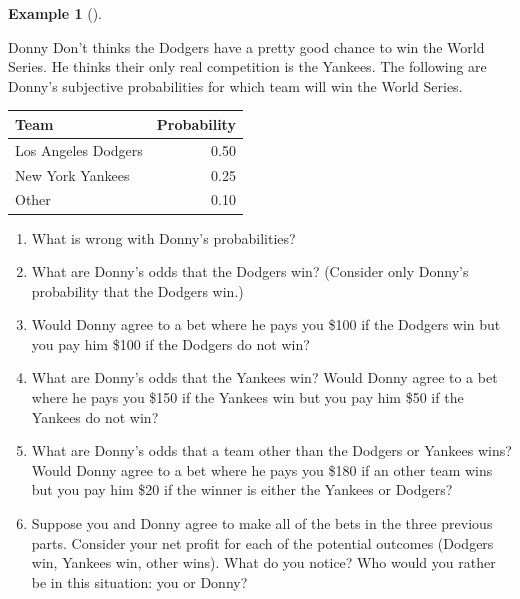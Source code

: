 \documentclass[
  letterpaper,
  DIV=11,
  numbers=noendperiod]{scrreprt}
\providecommand{\tightlist}{%
  \setlength{\itemsep}{0pt}\setlength{\parskip}{0pt}}
\theoremstyle{plain}
\theoremstyle{definition}
\newtheorem{example}{Example}[chapter]
\theoremstyle{definition}
\theoremstyle{definition}
\theoremstyle{remark}
\begin{document}
\begin{tcolorbox}[enhanced jigsaw, opacityback=0, left=2mm, colframe=quarto-callout-note-color-frame, toprule=.15mm, breakable, colback=white, leftrule=.75mm, arc=.35mm, rightrule=.15mm, bottomrule=.15mm]

\begin{example}[]\protect\hypertarget{exm-dutch}{}\label{exm-dutch}

Donny Don't thinks the Dodgers have a pretty good chance to win the
World Series. He thinks their only real competition is the Yankees. The
following are Donny's subjective probabilities for which team will win
the World Series.

\begin{longtable}[]{@{}lr@{}}
\toprule\noalign{}
Team & Probability \\
\midrule\noalign{}
\endhead
\bottomrule\noalign{}
\endlastfoot
Los Angeles Dodgers & 0.50 \\
New York Yankees & 0.25 \\
Other & 0.10 \\
\end{longtable}

\begin{enumerate}
\def\labelenumi{\arabic{enumi}.}
\tightlist
\item
  What is wrong with Donny's probabilities?
\item
  What are Donny's odds that the Dodgers win? (Consider only Donny's
  probability that the Dodgers win\footnotemark{}.)
\item
  Would Donny agree to a bet where he pays you \$100 if the Dodgers win
  but you pay him \$100 if the Dodgers do not win?
\item
  What are Donny's odds that the Yankees win? Would Donny agree to a bet
  where he pays you \$150 if the Yankees win but you pay him \$50 if the
  Yankees do not win?
\item
  What are Donny's odds that a team other than the Dodgers or Yankees
  wins? Would Donny agree to a bet where he pays you \$180 if an other
  team wins but you pay him \$20 if the winner is either the Yankees or
  Dodgers?
\item
  Suppose you and Donny agree to make all of the bets in the three
  previous parts. Consider your net profit for each of the potential
  outcomes (Dodgers win, Yankees win, other wins). What do you notice?
  Who would you rather be in this situation: you or Donny?
\end{enumerate}

\end{example}

\end{tcolorbox}
\end{document}
